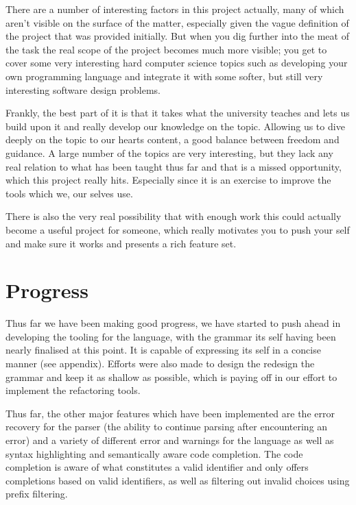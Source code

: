 \documentclass[11pt]{article}
\begin{document}
There are a number of interesting factors in this project actually, many of which aren't visible on the surface of the matter, especially given the vague definition of the project that was provided initially. But when you dig further into the meat of the task the real scope of the project becomes much more visible; you get to cover some very interesting hard computer science topics such as developing your own programming language and integrate it with some softer, but still very interesting software design problems.

Frankly, the best part of it is that it takes what the university teaches and lets us build upon it and really develop our knowledge on the topic. Allowing us to dive deeply on the topic to our hearts content, a good balance between freedom and guidance. A large number of the topics are very interesting, but they lack any real relation to what has been taught thus far and that is a missed opportunity, which this project really hits. Especially since it is an exercise to improve the tools which we, our selves use.

There is also the very real possibility that with enough work this could actually become a useful project for someone, which really motivates you to push your self and make sure it works and presents a rich feature set.

\section{Progress}

Thus far we have been making good progress, we have started to push ahead in developing the tooling for the language, with the grammar its self having been nearly finalised at this point. It is capable of expressing its self in a concise manner (see appendix). Efforts were also made to design the redesign the grammar and keep it as shallow as possible, which is paying off in our effort to implement the refactoring tools.

Thus far, the other major features which have been implemented are the error recovery for the parser (the ability to continue parsing after encountering an error) and a variety of different error and warnings for the language as well as syntax highlighting and semantically aware code completion. The code completion is aware of what constitutes a valid identifier and only offers completions based on valid identifiers, as well as filtering out invalid choices using prefix filtering. 
\end{document}
